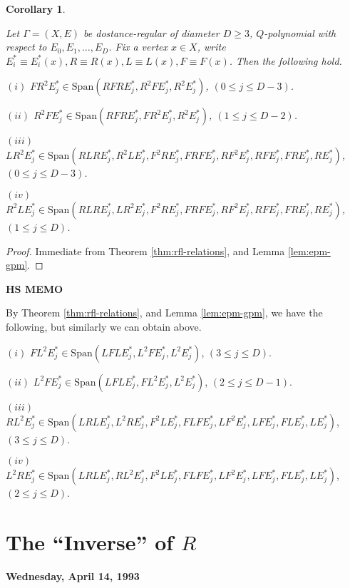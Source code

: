 \documentclass[
]{book}
\newtheorem{corollary}{Corollary}[chapter]
\theoremstyle{definition}
\theoremstyle{definition}
\theoremstyle{definition}
\theoremstyle{definition}
\theoremstyle{remark}
\begin{document}
\begin{corollary}
\protect\hypertarget{cor:fr2lr2r2l}{}\label{cor:fr2lr2r2l}

Let \(\Gamma = (X, E)\) be dostance-regular of diameter \(D\geq 3\), \(Q\)-polynomial with respect to \(E_0, E_1, \ldots, E_D\). Fix a vertex \(x\in X\), write \(E^*_i \equiv E^*_i(x), R\equiv R(x), L\equiv L(x), F\equiv F(x)\).
Then the following hold.

\((i)\) \(FR^2E^*_j \in \mathrm{Span}(RFRE^*_j, R^2FE^*_j, R^2E^*_j)\), \((0\leq j\leq D-3)\).

\((ii)\) \(R^2FE^*_j \in \mathrm{Span}(RFRE^*_j, FR^2E^*_j, R^2E^*_j)\), \((1\leq j\leq D-2)\).

\((iii)\) \(LR^2E^*_j \in \mathrm{Span}(RLRE^*_j, R^2LE^*_j, F^2RE^*_j, FRFE^*_j, RF^2E^*_j, RFE^*_j, FRE^*_j, RE^*_j)\), \((0\leq j\leq D-3)\).

\((iv)\) \(R^2LE^*_j \in \mathrm{Span}(RLRE^*_j, LR^2E^*_j, F^2RE^*_j, FRFE^*_j, RF^2E^*_j, RFE^*_j, FRE^*_j, RE^*_j)\), \((1\leq j\leq D)\).

\end{corollary}

\begin{proof}
Immediate from Theorem \ref{thm:rfl-relations}, and Lemma \ref{lem:epm-gpm}.
\end{proof}

\textbf{HS MEMO}

By Theorem \ref{thm:rfl-relations}, and Lemma \ref{lem:epm-gpm}, we have the following, but similarly we can obtain above.

\((i)\) \(FL^2E^*_j \in \mathrm{Span}(LFLE^*_j, L^2FE^*_j, L^2E^*_j)\), \((3\leq j\leq D)\).

\((ii)\) \(L^2FE^*_j \in \mathrm{Span}(LFLE^*_j, FL^2E^*_j, L^2E^*_j)\), \((2\leq j\leq D-1)\).

\((iii)\) \(RL^2E^*_j \in \mathrm{Span}(LRLE^*_j, L^2RE^*_j, F^2LE^*_j, FLFE^*_j, LF^2E^*_j, LFE^*_j, FLE^*_j, LE^*_j)\), \((3\leq j\leq D)\).

\((iv)\) \(L^2RE^*_j \in \mathrm{Span}(LRLE^*_j, RL^2E^*_j, F^2LE^*_j, FLFE^*_j, LF^2E^*_j, LFE^*_j, FLE^*_j, LE^*_j)\), \((2\leq j\leq D)\).

\hypertarget{lec31}{%
\chapter{\texorpdfstring{The ``Inverse'' of \(R\)}{The ``Inverse'' of R}}\label{lec31}}

\textbf{Wednesday, April 14, 1993}
\end{document}
